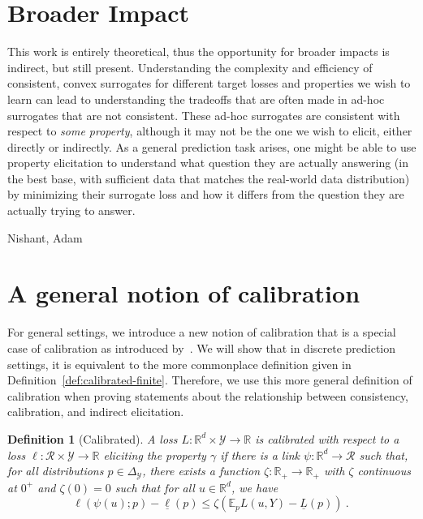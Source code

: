 \documentclass{article}
\newcommand{\reals}{\mathbb{R}}
\newcommand{\simplex}{\Delta_\Y}
\newcommand{\E}{\mathbb{E}}
\newcommand{\R}{\mathcal{R}}
\newcommand{\Y}{\mathcal{Y}}
\newcommand{\exploss}[3]{\E_{#3} #1(#2,Y)}
\newcommand{\risk}[1]{\underline{#1}}
\newtheorem{definition}{Definition}
\begin{document}
\newpage

\section*{Broader Impact}
This work is entirely theoretical, thus the opportunity for broader impacts is indirect, but still present.
Understanding the complexity and efficiency of consistent, convex surrogates for different target losses and properties we wish to learn can lead to understanding the tradeoffs that are often made in ad-hoc surrogates that are not consistent.
These ad-hoc surrogates are consistent with respect to \emph{some property}, although it may not be the one we wish to elicit, either directly or indirectly.
As a general prediction task arises, one might be able to use property elicitation to understand what question they are actually answering (in the best base, with sufficient data that matches the real-world data distribution) by minimizing their surrogate loss and how it differs from the question they are actually trying to answer.

\begin{ack}
Nishant, Adam
\end{ack}




\newpage
\appendix
\section{A general notion of calibration}\label{app:calibration}
For general settings, we introduce a new notion of calibration that is a special case of calibration as introduced by~\citet[Chapter 3]{steinwart2008support}.
We will show that in discrete prediction settings, it is equivalent to the more commonplace definition given in Definition~\ref{def:calibrated-finite}.
Therefore, we use this more general definition of calibration when proving statements about the relationship between consistency, calibration, and indirect elicitation.

\begin{definition}[Calibrated]\label{def:calibrated-general}
	A loss $L:\reals^d \times \Y \to \reals$ is \emph{calibrated} with respect to a loss $\ell : \R \times \Y \to \reals$ eliciting the property $\gamma$ if there is a link $\psi : \reals^d \to \R$ such that, for all distributions $p \in \simplex$, there exists a function $\zeta : \reals_+ \to \reals_+$ with $\zeta$ continuous at $0^+$ and $\zeta(0) = 0$ such that for all $u \in \reals^d$, we have
	\begin{equation}\label{eq:calibrated-general}
	\ell( \psi(u); p) - \risk{\ell}(p)  \leq \zeta \left(  \exploss{L}{u}{p} - \risk{L}(p) \right)~.~
	\end{equation}
\end{definition}
\end{document}
